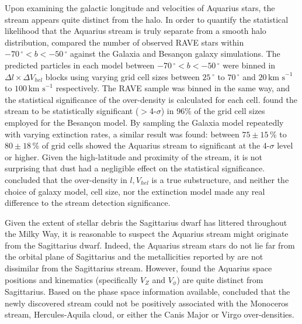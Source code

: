 \documentclass{emulateapj}
\begin{document}
Upon examining the galactic longitude and velocities of Aquarius stars, the stream appears quite distinct from the halo. In order to quantify the statistical likelihood that the Aquarius stream is truly separate from a smooth halo distribution, \citet{williams;et-al_2011} compared the number of observed RAVE stars within $-70\,^\circ < b < -50\,^\circ$ against the Galaxia \citep{sharma;et-al_2011} and Besan\c{c}on \citep{robin;et-al_2003} galaxy simulations. The predicted particles in each model between $-70\,^\circ < b < -50\,^\circ$ were binned in $\Delta{l} \times \Delta{V_{hel}}$ blocks using varying grid cell sizes between $25\,^\circ$ to $70\,^\circ$ and $20\,\mbox{km s}^{-1}$ to $100\,\mbox{km s}^{-1}$ respectively. The RAVE sample was binned in the same way, and the statistical significance of the over-density is calculated for each cell. \citet{williams;et-al_2011} found the stream to be statistically significant ($>$4-$\sigma$) in 96\% of the grid cell sizes employed for the Besan\c{c}on model. By sampling the Galaxia model repeatedly with varying extinction rates, a similar result was found: between $75\pm15$\,\% to $80\pm18$\,\% of grid cells showed the Aquarius stream to significant at the 4-$\sigma$ level or higher. Given the high-latitude and proximity of the stream, it is not surprising that dust had a negligible effect on the statistical significance. \citet{williams;et-al_2011} concluded that the over-density in $l, V_{hel}$ is a true substructure, and neither the choice of galaxy model, cell size, nor the extinction model made any real difference to the stream detection significance.




Given the extent of stellar debris the Sagittarius dwarf has littered throughout the Milky Way, it is reasonable to suspect the Aquarius stream might originate from the Sagittarius dwarf. Indeed, the Aquarius stream stars do not lie far from the orbital plane of Sagittarius and the metallicities reported by \citet{williams;et-al_2011} are not dissimilar from the Sagittarius stream. However, \citet{williams;et-al_2011} found the Aquarius space positions and kinematics (specifically $V_{Z}$ and $V_\phi$) are quite distinct from Sagittarius. Based on the phase space information available, \citet{williams;et-al_2011} concluded that the newly discovered stream could not be positively associated with the Monoceros stream, Hercules-Aquila cloud, or either the Canis Major or Virgo over-densities. 
\end{document}
